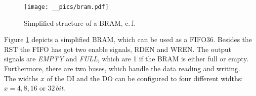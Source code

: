 \begin{figure}[h]
		\texttt{[image: \_\_pics/bram.pdf]}
		\caption{Simplified structure of a BRAM, c.\,f. \cite{Xilinx2010c}}
		\label{pic:bram}	
	\end{figure} 
	
		
Figure \ref{pic:bram} depicts a simplified \ac{BRAM}, which can be used as a \ac{FIFO36}. Besides the \ac{RST} the \ac{FIFO} has got two enable signals, \ac{RDEN} and \ac{WREN}. The output signals are \textit{EMPTY} and \textit{FULL}, which are 1 if the \ac{BRAM} is either full or empty. Furthermore, there are two buses, which handle the data reading and writing. The widths $x$ of the \ac{DI} and the \ac{DO} can be configured to four different widths: $x = 4, 8, 16$ or $32\,bit$.